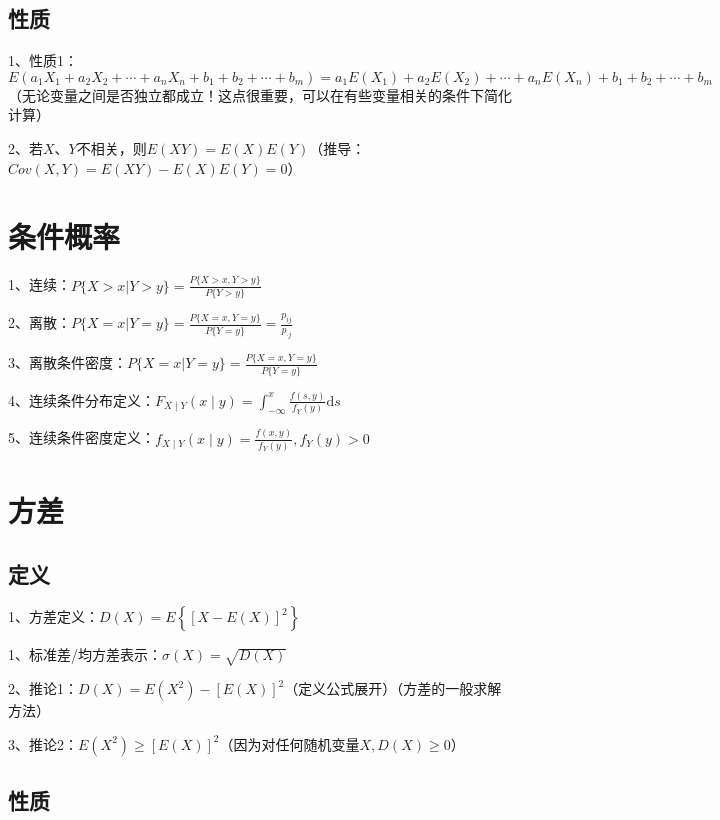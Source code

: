 \subsection{性质}

1、性质1：$ E(a_1X_1+a_2X_2+\cdots+a_nX_n+b_1+b_2+\cdots+b_m)=a_1E(X_1)+a_2E(X_2)+\cdots+a_nE(X_n)+b_1+b_2+\cdots+b_m $（无论变量之间是否独立都成立！这点很重要，可以在有些变量相关的条件下简化计算）

2、若$ X $、$ Y $不相关，则$ E ( X Y ) = E ( X ) E ( Y ) $（推导：$ C o v ( X , Y ) = E ( X Y ) - E ( X ) E ( Y ) =0 $）

\section{条件概率}

1、连续：$ P\{X>x|Y>y\} = \frac {P\{X>x,Y>y\}}{P\{Y>y\}} $

2、离散：$ P\{X=x|Y=y\} = \frac {P\{X=x,Y=y\}}{P\{Y=y\}} = \frac {p_{ij}}{p_{\cdot j}} $

3、离散条件密度：$ P\{X=x|Y=y\} = \frac {P\{X=x,Y=y\}}{P\{Y=y\}} $

4、连续条件分布定义：$ F_{X \mid Y}(x \mid y)=\int_{-\infty}^{x} \frac{f(s, y)}{f_{Y}(y)} \mathrm{d} s $

5、连续条件密度定义：$ f_{X \mid Y}(x \mid y)=\frac{f(x, y)}{f_{Y}(y)}, f_{Y}(y)>0 $

\section{方差}



\subsection{定义}

1、方差定义：$ D(X)=E\left\{[X-E(X)]^{2}\right\} $

1、标准差/均方差表示：$ \sigma(X)=\sqrt{D(X)} $

2、推论1：$ D(X)=E\left(X^{2}\right)-[E(X)]^{2} $（定义公式展开）（方差的一般求解方法）

3、推论2：$ E\left(X^{2}\right) \geqslant[E(X)]^{2} $（因为对任何随机变量$ X, D(X) \geqslant 0 $）



\subsection{性质}

